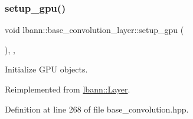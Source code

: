 \mbox{\label{classlbann_1_1base__convolution__layer_a4fb0ec8793656a7c32ff37c266b29a68}} 
\subsubsection{\texorpdfstring{setup\+\_\+gpu()}{setup\_gpu()}}
{\footnotesize\ttfamily void lbann\+::base\+\_\+convolution\+\_\+layer\+::setup\+\_\+gpu (\begin{DoxyParamCaption}{ }\end{DoxyParamCaption})\hspace{0.3cm}{\ttfamily [inline]}, {\ttfamily [override]}, {\ttfamily [virtual]}}



Initialize G\+PU objects. 



Reimplemented from \hyperlink{classlbann_1_1Layer_a36aa22ef90ce4de65abe729d38490863}{lbann\+::\+Layer}.



Definition at line 268 of file base\+\_\+convolution.\+hpp.


